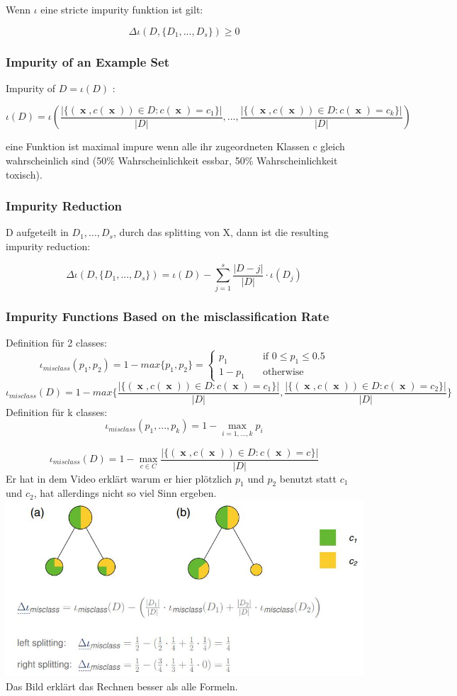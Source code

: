 \documentclass[11pt,a4paper]{article}
\DeclareMathOperator*{\x}{\textbf{x}}
\begin{document}
\begin{flushleft}
Wenn $\iota $ eine stricte impurity funktion ist gilt:

$$ \Delta \iota ( D, \{D_1, ..., D_s\} ) \geq 0 $$

\subsubsection{Impurity of an Example Set}
Impurity of $D = \iota(D) $ :

$$ \iota (D) = \iota (\frac{|\{ (\x , c( \x ) ) \in D: c(\x ) = c_1 \}|}{|D|}, ... , \frac{|\{ (\x , c( \x ) ) \in D: c(\x ) = c_k \}|}{|D|} ) $$

eine Funktion ist maximal impure wenn alle ihr zugeordneten Klassen c gleich wahrscheinlich sind (50\% Wahrscheinlichkeit essbar, 50\% Wahrscheinlichkeit toxisch). 
\subsubsection{Impurity Reduction}
D aufgeteilt in $D_1, ..., D_s$, durch das splitting von X, dann ist die resulting impurity reduction: 

$$ \Delta \iota (D, \{D_1,..., D_s\}) = \iota (D) - \sum_{j=1}^s \frac{|D-j|}{|D|} \cdot \iota (D_j) $$

\subsubsection{Impurity Functions Based on the misclassification Rate}
Definition für 2 classes:
$$ \iota_{misclass} (p_1,p_2) = 1 - max \{p_1,p_2\} = 
\begin{cases}
p_1      & \quad \text{if } 0 \leq p_1 \leq 0.5 \\
1-p_1  & \quad \text{otherwise}
\end{cases} $$
$$ \iota_{misclass} (D) = 1 - max \{ \frac{|\{ (\x , c(\x )) \in D: c(\x ) = c_1 \}|}{|D|}, \frac{|\{ (\x , c(\x )) \in D: c(\x ) = c_2 \}|}{|D|}\} $$
Definition für k classes: 
$$ \iota_{misclass} (p_1, ... , p_k) = 1 - \max_{i = 1, ..., k} p_i $$

$$ \iota_{misclass} (D) = 1 - \max_{c \in C}  \frac{|\{ (\x , c(\x )) \in D: c(\x ) = c \}|}{|D|} $$
Er hat in dem Video erklärt warum er hier plötzlich $p_1$ und $p_2$ benutzt statt $c_1$ und $c_2$, hat allerdings nicht so viel Sinn ergeben. 
\includegraphics[width = \textwidth]{impurity}
Das Bild erklärt das Rechnen besser als alle Formeln.


\end{flushleft}
\end{document}
